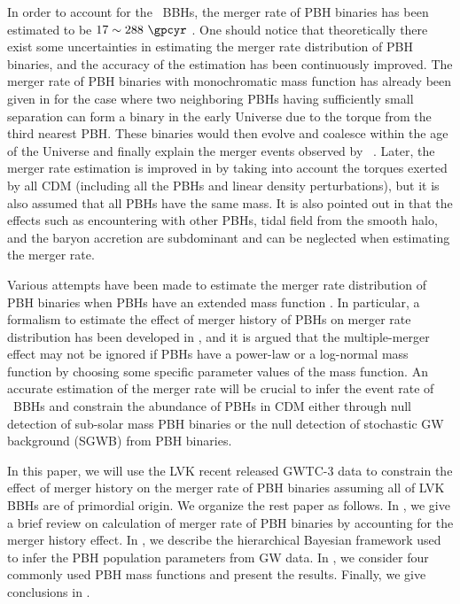 \documentclass[twocolumn]{aastex631}
\begin{document}
In order to account for the \lvc\ BBHs, the merger rate of PBH binaries has
been estimated to be $17 \sim 288~\gpcyr$ \cite{Chen:2018rzo}.
One should notice that theoretically there exist some uncertainties in
estimating the merger rate distribution of PBH binaries, and the accuracy of 
the estimation has been continuously improved.
The merger rate of PBH binaries with monochromatic mass function has already
been given in \cite{Nakamura:1997sm,Sasaki:2016jop} for the case where two 
neighboring PBHs having sufficiently small separation can form a binary in
the early Universe due to the torque from the third nearest PBH.
These binaries would then evolve and coalesce within the age of the Universe 
and finally explain the merger events observed by \lvc\
\cite{Sasaki:2016jop}.
Later, the merger rate estimation is improved in \cite{Ali-Haimoud:2017rtz} 
by taking into account the torques exerted by all CDM (including all the PBHs
and linear density perturbations), but it is also assumed that all PBHs have
the same mass.
It is also pointed out in \cite{Ali-Haimoud:2017rtz} that the effects such as
encountering with other PBHs, tidal field from the smooth halo, and
the baryon accretion are subdominant and can be neglected when estimating
the merger rate.

Various attempts have been made to estimate the merger rate distribution
of PBH binaries when PBHs have an extended mass function 
\cite{Chen:2018czv,Chen:2018rzo,Raidal:2018bbj,Raidal:2017mfl,Liu:2018ess,Liu:2020cds,Vaskonen:2019jpv}.
In particular, a formalism to estimate the effect of merger history of PBHs
on merger rate distribution has been developed in \cite{Liu:2019rnx},
and it is argued that the multiple-merger effect may not be ignored if
PBHs have a power-law or a log-normal mass function by choosing some specific
parameter values of the mass function.
An accurate estimation of the merger rate will be crucial to infer the event
rate of \lvc\ BBHs and constrain the abundance of PBHs in CDM either through
null detection of sub-solar mass PBH binaries or the null detection
of stochastic GW background (SGWB) from PBH binaries.

In this paper, we will use the LVK recent released GWTC-3 data to constrain the effect of merger history on the merger rate of PBH binaries assuming all of LVK BBHs are of primordial origin.
We organize the rest paper as follows.
In , we give a brief review on calculation of merger rate of PBH binaries by accounting for the merger history effect.
In \Sec{method}, we describe the hierarchical Bayesian framework used to infer the PBH population parameters from GW data.
In \Sec{result}, we consider four commonly used PBH mass functions and present the results.
Finally, we give conclusions in \Sec{conclusion}.
\end{document}

